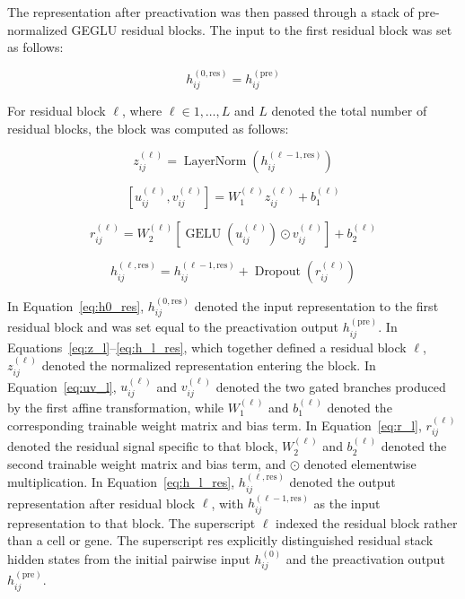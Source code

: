 \documentclass[11pt]{article}
\begin{document}
The representation after preactivation was then passed through a stack of pre-normalized GEGLU residual blocks. The input to the first residual block was set as follows:

\begin{equation}
h_{ij}^{(0,\mathrm{res})}=h_{ij}^{(\mathrm{pre})}
  \label{eq:h0_res}
\end{equation}

For residual block $\ell$, where $\ell\in{1,\ldots,L}$ and $L$ denoted the total number of residual blocks, the block was computed as follows:

\begin{equation}
z_{ij}^{(\ell)}=
\operatorname{LayerNorm}
\left(
h_{ij}^{(\ell-1,\mathrm{res})}
\right)
  \label{eq:z_l}
\end{equation}

\begin{equation}
\left[
u_{ij}^{(\ell)},v_{ij}^{(\ell)}
\right]
=
W_{1}^{(\ell)}z_{ij}^{(\ell)}+
b_{1}^{(\ell)}
  \label{eq:uv_l}
\end{equation}

\begin{equation}
r_{ij}^{(\ell)}=
W_{2}^{(\ell)}
\left[
\operatorname{GELU}
\left(
u_{ij}^{(\ell)}
\right)
\odot
v_{ij}^{(\ell)}
\right]+
b_{2}^{(\ell)}
  \label{eq:r_l}
\end{equation}

\begin{equation}
h_{ij}^{(\ell,\mathrm{res})}=
h_{ij}^{(\ell-1,\mathrm{res})}+
\operatorname{Dropout}
\left(
r_{ij}^{(\ell)}
\right)
  \label{eq:h_l_res}
\end{equation}

In Equation~\ref{eq:h0_res}, $h_{ij}^{(0,\mathrm{res})}$ denoted the input representation to the first residual block and was set equal to the preactivation output $h_{ij}^{(\mathrm{pre})}$. In Equations~\ref{eq:z_l}--\ref{eq:h_l_res}, which together defined a residual block $\ell$, $z_{ij}^{(\ell)}$ denoted the normalized representation entering the block. In Equation~\ref{eq:uv_l}, $u_{ij}^{(\ell)}$ and $v_{ij}^{(\ell)}$ denoted the two gated branches produced by the first affine transformation, while $W_{1}^{(\ell)}$ and $b_{1}^{(\ell)}$ denoted the corresponding trainable weight matrix and bias term. In Equation~\ref{eq:r_l}, $r_{ij}^{(\ell)}$ denoted the residual signal specific to that block, $W_{2}^{(\ell)}$ and $b_{2}^{(\ell)}$ denoted the second trainable weight matrix and bias term, and $\odot$ denoted elementwise multiplication. In Equation~\ref{eq:h_l_res}, $h_{ij}^{(\ell,\mathrm{res})}$ denoted the output representation after residual block $\ell$, with $h_{ij}^{(\ell-1,\mathrm{res})}$ as the input representation to that block. The superscript $\ell$ indexed the residual block rather than a cell or gene. The superscript $\mathrm{res}$ explicitly distinguished residual stack hidden states from the initial pairwise input $h_{ij}^{(0)}$ and the preactivation output $h_{ij}^{(\mathrm{pre})}$.
\end{document}
